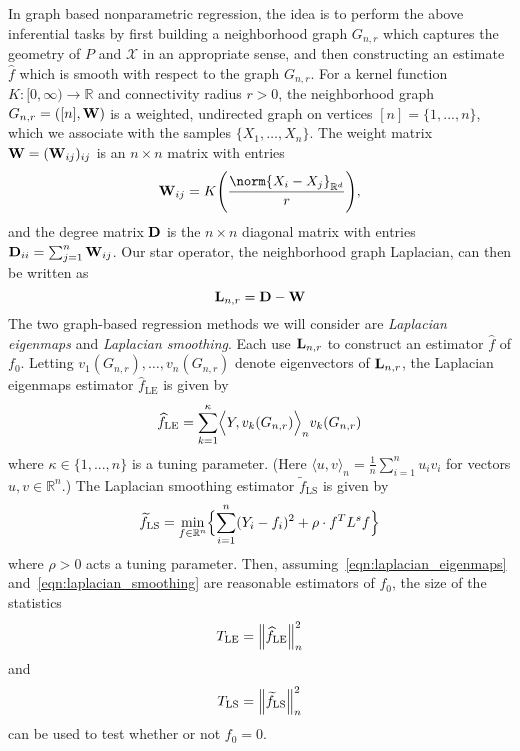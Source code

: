 \documentclass{article}
\newcommand{\Reals}{\mathbb{R}}
\newcommand{\1}{\mathbf{1}}
\newcommand{\Rd}{\Reals^d}
\newcommand{\Lap}{{\bf L}}
\newcommand{\mc}[1]{\mathcal{#1}}
\newcommand{\dotp}[2]{\langle #1, #2 \rangle}
\newcommand{\Dotp}[2]{\Bigl\langle #1, #2 \Bigr\rangle}
\newcommand{\wt}[1]{\widetilde{#1}}
\newcommand{\wh}[1]{\widehat{#1}}
\newcommand{\LE}{\mathrm{LE}}
\newcommand{\LS}{\mathrm{LS}}
\theoremstyle{alden}
\theoremstyle{aldenthm}
\theoremstyle{definition}
\theoremstyle{remark}
\begin{document}
In graph based nonparametric regression, the idea is to perform the above inferential tasks by first building a neighborhood graph $G_{n,r}$ which captures the geometry of $P$ and $\mc{X}$ in an appropriate sense, and then constructing an estimate $\wh{f}$ which is smooth with respect to the graph $G_{n,r}$. For a kernel function $K: [0,\infty) \to \Reals$ and connectivity radius $r > 0$, the neighborhood graph $G_{n,r} = ([n],{\bf W})$ is a weighted, undirected graph on vertices $[n] = \{1,...,n\}$, which we associate with the samples $\{X_1,\ldots,X_n\}$. The weight matrix ${\bf W} = ({\bf W}_{ij})_{ij}$ is an $n \times n$ matrix with entries
\begin{equation*}
\label{eqn:neighborhood_graph}
{\bf W}_{ij} = K\Biggl(\frac{\norm{X_i - X_j}_{\Rd}}{r}\Biggr),
\end{equation*}
and the degree matrix ${\bf D}$ is the $n \times n$ diagonal matrix with entries ${\bf D}_{ii} = \sum_{j = 1}^{n}{\bf W}_{ij}$.  Our star operator, the neighborhood graph Laplacian, can then be written as
\begin{equation}
\label{eqn:graph_Laplacian}
\Lap_{n,r} = \bf{D} - \bf{W}
\end{equation}
The two graph-based regression methods we will consider are \emph{Laplacian eigenmaps} and \emph{Laplacian smoothing}. Each use $\Lap_{n,r}$ to construct an estimator $\wh{f}$ of $f_0$. Letting $v_1(G_{n,r}),\ldots,v_n(G_{n,r})$ denote eigenvectors of $\Lap_{n,r}$, the Laplacian eigenmaps estimator $\wh{f}_{\LE}$ \citep{belkin2003} is given by 
\begin{equation}
\label{eqn:laplacian_eigenmaps}
\wh{f}_{\textrm{LE}} = \sum_{k = 1}^{\kappa} \Dotp{Y}{v_k(G_{n,r})}_n v_{k}(G_{n,r})
\end{equation}
where $\kappa \in \{1,...,n\}$ is a tuning parameter. (Here $\dotp{u}{v}_n = \frac{1}{n}\sum_{i = 1}^{n} u_i v_i$ for vectors $u,v \in \Reals^n$.) The Laplacian smoothing estimator $\wt{f}_{\LS}$ \citep{smola2003} is given by
\begin{equation}
\label{eqn:laplacian_smoothing}
\wt{f}_{\LS}= \min_{f \in \Reals^n} \Bigl\{\sum_{i = 1}^{n}(Y_i - f_i)^2 + \rho \cdot f^T L^s f \Bigr\}
\end{equation}
where $\rho > 0$ acts a tuning parameter. Then, assuming~\eqref{eqn:laplacian_eigenmaps} and~\eqref{eqn:laplacian_smoothing} are reasonable estimators of $f_0$, the size of the statistics
\begin{equation}
T_{\LE} = \Bigl\|\wh{f}_{\LE}\Bigr\|_n^2 \label{eqn:laplacian_eigenmaps_test}
\end{equation}
and
\begin{equation}
T_{\LS} = \Bigl\|\wt{f}_{\LS}\Bigr\|_n^2 \label{eqn:laplacian_smoothing_test}
\end{equation}
can be used to test whether or not $f_0 = 0$.
\end{document}

